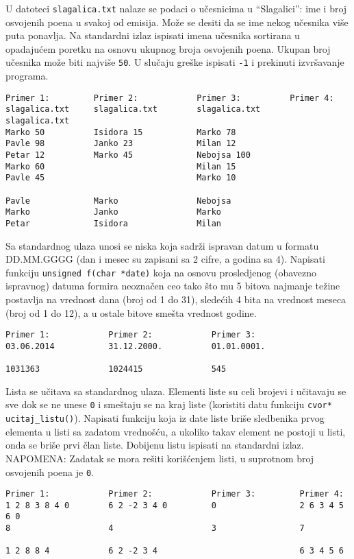 \begin{z}
U datoteci {\tt slagalica.txt} nalaze se podaci o u\v cesnicima u ``Slagalici'': ime i broj osvojenih
 poena u svakoj od emisija. Mo\v ze se desiti da se ime nekog u\v cesnika vi\v se puta ponavlja. Na standardni izlaz ispisati
imena u\v cesnika sortirana u opadaju\'cem poretku na osnovu ukupnog broja osvojenih poena.
Ukupan broj u\v cesnika mo\v ze biti najvi\v se {\tt 50}.
U slu\v caju gre\v ske ispisati {\tt -1} i prekinuti izvr\v savanje programa.
\end{z}
\begin{verbatim}
Primer 1:         Primer 2:            Primer 3:          Primer 4:
slagalica.txt     slagalica.txt        slagalica.txt      slagalica.txt
Marko 50          Isidora 15           Marko 78
Pavle 98          Janko 23             Milan 12
Petar 12          Marko 45             Nebojsa 100
Marko 60                               Milan 15
Pavle 45                               Marko 10

Pavle             Marko                Nebojsa
Marko             Janko                Marko
Petar             Isidora              Milan
\end{verbatim}

\begin{z}
Sa standardnog ulaza unosi se niska koja sadr\v zi ispravan datum u formatu
DD.MM.GGGG (dan i mesec su zapisani sa 2 cifre, a godina sa 4). Napisati
funkciju {\tt unsigned f(char *date)} koja na osnovu prosledjenog
(obavezno ispravnog) datuma formira neozna\v cen ceo tako \v sto mu
5 bitova najmanje te\v zine postavlja na vrednost dana (broj od 1 do
31), slede\' cih 4 bita na vrednost meseca (broj od 1 do 12), a u ostale
bitove sme\v sta vrednost godine.
\end{z}

\begin{verbatim}
Primer 1:            Primer 2:            Primer 3:
03.06.2014           31.12.2000.          01.01.0001.

1031363              1024415              545
\end{verbatim}


\begin{z}
Lista se u\v citava sa standardnog ulaza. Elementi liste su celi brojevi i u\v citavaju se sve dok se ne
unese {\tt 0} i sme\v staju se na kraj liste (koristiti datu funkciju {\tt cvor* ucitaj\_listu()}).
Napisati funkciju koja iz date liste bri\v se sledbenika prvog elementa u listi sa zadatom vredno\v s\' cu,
a ukoliko takav element ne postoji u listi, onda se bri\v se prvi \v clan liste.
Dobijenu listu ispisati na standardni izlaz.
NAPOMENA: Zadatak se mora re\v siti kori\v s\'cenjem listi, u suprotnom broj osvojenih poena je {\tt 0}.
\end{z}
\begin{verbatim}
Primer 1:            Primer 2:            Primer 3:         Primer 4:
1 2 8 3 8 4 0        6 2 -2 3 4 0         0                 2 6 3 4 5 6 0
8                    4                    3                 7

1 2 8 8 4            6 2 -2 3 4                             6 3 4 5 6
\end{verbatim}

